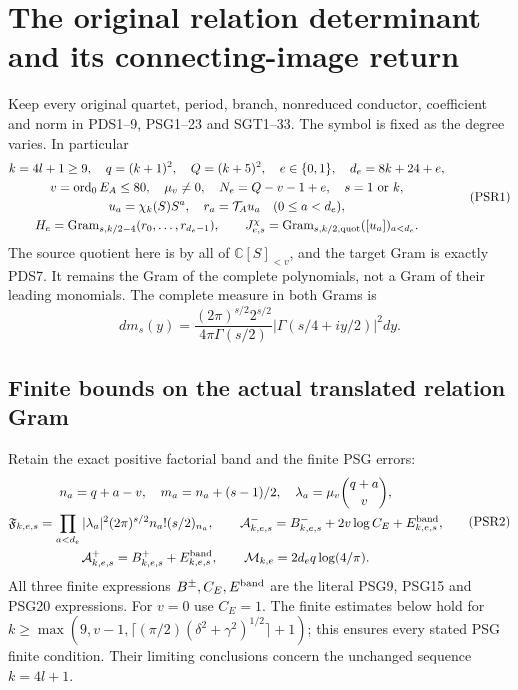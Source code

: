 \documentclass[10pt]{article}
\begin{document}
\section{The original relation determinant and its connecting-image return}
\label{sec:PSR}

Keep every original quartet, period, branch, nonreduced conductor,
coefficient and norm in PDS1--9, PSG1--23 and SGT1--33. The symbol is
fixed as the degree varies. In particular
\[
\begin{gathered}
 k=4l+1\ge9,\quad q=(k+1)^2,\quad Q=(k+5)^2,\quad
 e\in\{0,1\},\quad d_e=8k+24+e,\\
 v=\operatorname{ord}_0E_A\le80,\quad\mu_v\ne0,\quad
 N_e=Q-v-1+e,\quad s=1\ \hbox{or}\ k,\\
 u_a=\chi_k(S)S^a,\quad r_a=\mathcal T_Au_a\quad(0\le a<d_e),\\
 H_e=\operatorname{Gram}_{s,k/2-4}(r_0,\ldots,r_{d_e-1}),\qquad
 J^\chi_{e,s}=\operatorname{Gram}_{s,k/2,\mathrm{quot}}([u_a])_{a<d_e}.
\end{gathered}\tag{PSR1}
\]
The source quotient here is by all of $\mathbb C[S]_{<v}$, and the
target Gram is exactly PDS7. It remains the Gram of the complete
polynomials, not a Gram of their leading monomials. The complete measure
in both Grams is
\[
 dm_s(y)=\frac{(2\pi)^{s/2}2^{s/2}}{4\pi\Gamma(s/2)}
             |\Gamma(s/4+iy/2)|^2dy.
\]

\subsection{Finite bounds on the actual translated relation Gram}
Retain the exact positive factorial band and the finite PSG errors:
\[
\begin{gathered}
 n_a=q+a-v,\quad m_a=n_a+(s-1)/2,\quad
 \lambda_a=\mu_v\binom{q+a}{v},\\
 \mathfrak F_{k,e,s}
   =\prod_{a<d_e}|\lambda_a|^2(2\pi)^{s/2}n_a!(s/2)_{n_a},\qquad
 \mathcal A^-_{k,e,s}=B^-_{k,e,s}+2v\log C_E+E^{\rm band}_{k,e,s},\\
 \mathcal A^+_{k,e,s}=B^+_{k,e,s}+E^{\rm band}_{k,e,s},\qquad
 \mathcal M_{k,e}=2d_eq\log(4/\pi).
\end{gathered}\tag{PSR2}
\]
All three finite expressions $B^\pm,C_E,E^{\rm band}$ are the literal
PSG9, PSG15 and PSG20 expressions. For $v=0$ use $C_E=1$.
The finite estimates below hold for
$k\ge\max(9,v-1,\lceil(\pi/2)(\delta^2+\gamma^2)^{1/2}\rceil+1)$;
this ensures every stated PSG finite condition. Their limiting
conclusions concern the unchanged sequence $k=4l+1$.
\end{document}
